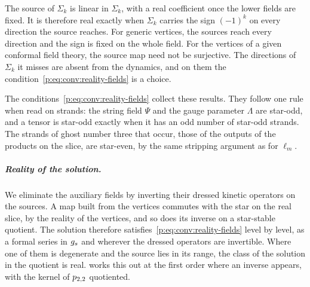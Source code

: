 The source of $\Sigma_k$ is linear in $\Sigma_k$, with a real coefficient once the lower fields are fixed.
It is therefore real exactly when $\Sigma_k$ carries the sign $(-1)^k$ on every direction the source reaches.
For generic vertices, the sources reach every direction and the sign is fixed on the whole field.
For the vertices of a given conformal field theory, the source map need not be surjective.
The directions of $\Sigma_k$ it misses are absent from the dynamics, and on them the condition~\eqref{p:eq:conv:reality-fields} is a choice.

The conditions~\eqref{p:eq:conv:reality-fields} collect these results.
They follow one rule when read on strands: the string field $\Psi$ and the gauge parameter $\Lambda$ are star-odd, and a tensor is star-odd exactly when it has an odd number of star-odd strands.
The strands of ghost number three that occur, those of the outputs of the products on the slice, are star-even, by the same stripping argument as for $\ell_m$.

\subparagraph{Reality of the solution.}

We eliminate the auxiliary fields by inverting their dressed kinetic operators on the sources.
A map built from the vertices commutes with the star on the real slice, by the reality of the vertices, and so does its inverse on a star-stable quotient.
The solution therefore satisfies~\eqref{p:eq:conv:reality-fields} level by level, as a formal series in $g_s$ and wherever the dressed operators are invertible.
Where one of them is degenerate and the source lies in its range, the class of the solution in the quotient is real.
 works this out at the first order where an inverse appears, with the kernel of $p_{2,2}$ quotiented.
